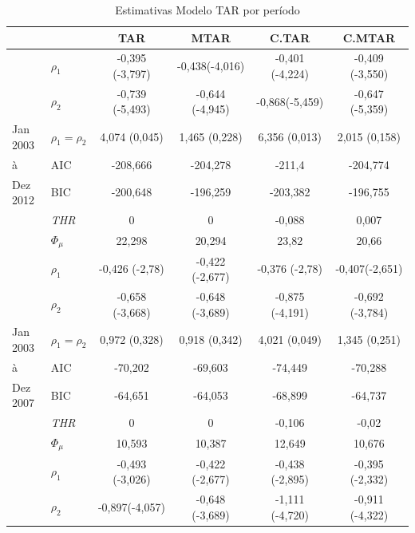 \documentclass[
	article,			%
	12pt,				%
	openright,			%
	oneside,			%
	a4paper,			%
	english,			%
	brazil				%
	]{abntex2}
\begin{document}
\begin{table}[htbp]
   \centering
  \caption{Estimativas Modelo TAR por período}
    \begin{tabularx}{\textwidth}{X||l|c|c|c|c}
 \toprule
                   &       &  \multicolumn{1}{c}{TAR} & \multicolumn{1}{c}{MTAR} & \multicolumn{1}{c}{C.TAR}  & \multicolumn{1}{c}{C.MTAR} \\ \hline \hline
   					& $\rho_{1}$			&  -0,395 (-3,797) & -0,438(-4,016) &	-0,401 (-4,224) & -0,409 (-3,550) \\
         				& $\rho_{2}$ 			&  -0,739 (-5,493) & -0,644 (-4,945) & -0,868(-5,459) & -0,647 (-5,359) \\
         	Jan 2003	& $\rho_{1}=\rho_{2}$	&  4,074 (0,045)   & 	1,465 (0,228)  & 	6,356 (0,013) &  2,015 (0,158)    \\
  		à			& AIC 					&	-208,666 	  &  -204,278         & 	-211,4		& -204,774           \\
    		Dez 2012	& BIC 					&	-200,648 	  &  -196,259         & 	-203,382	& -196,755           \\
    					& \textit{THR} 			&	0		 	  &  0		         & 	-0,088		& 0,007           \\
    					& $\Phi_{\mu}$ 			&     	 22,298	  &      20,294 	   &	23,82		& 20,66		 \\   \hline
   		        		& $\rho_{1}$			&  -0,426 (-2,78)  & -0,422 (-2,677)  & -0,376 (-2,78) & -0,407(-2,651) \\
         				& $\rho_{2}$ 			&  -0,658 (-3,668) & -0,648 (-3,689) & -0,875 (-4,191) & -0,692 (-3,784) \\
         	Jan 2003	& $\rho_{1}=\rho_{2}$	&  0,972 (0,328)		 & 0,918 (0,342)	  & 4,021 (0,049) & 1,345 (0,251) \\
  		à			& 	AIC 				&  -70,202 		  & -69,603    	 & -74,449 		& -70,288 \\
  		Dez 2007	& 	BIC 					&  -64,651    	 & -64,053    	 & -68,899		& -64,737 \\
  					& \textit{THR}			&  0   			 &  0  	 		  & -0,106		& -0,02     \\		
    					& $\Phi_{\mu}$ 			&  10,593    			& 10,387		  & 12,649		& 10,676   \\    \hline       	
          				& $\rho_{1}$	   	&  -0,493 (-3,026) & -0,422 (-2,677)  & -0,438 (-2,895) & -0,395 (-2,332) 		\\
         				& $\rho_{2}$ 		& -0,897(-4,057)	 & -0,648 (-3,689)   & -1,111 (-4,720)	 &  -0,911 (-4,322) 		\\

\end{tabularx}
\end{table}
\end{document}
